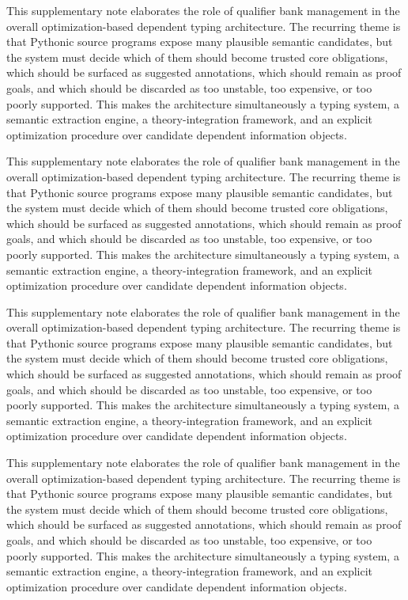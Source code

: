 \documentclass[11pt]{article}
\theoremstyle{definition}
\theoremstyle{plain}
\begin{document}
This supplementary note elaborates the role of qualifier bank management in the overall
optimization-based dependent typing architecture. The recurring theme is that
Pythonic source programs expose many plausible semantic candidates, but the
system must decide which of them should become trusted core obligations, which
should be surfaced as suggested annotations, which should remain as proof
goals, and which should be discarded as too unstable, too expensive, or too
poorly supported. This makes the architecture simultaneously a typing system,
a semantic extraction engine, a theory-integration framework, and an explicit
optimization procedure over candidate dependent information objects.

This supplementary note elaborates the role of qualifier bank management in the overall
optimization-based dependent typing architecture. The recurring theme is that
Pythonic source programs expose many plausible semantic candidates, but the
system must decide which of them should become trusted core obligations, which
should be surfaced as suggested annotations, which should remain as proof
goals, and which should be discarded as too unstable, too expensive, or too
poorly supported. This makes the architecture simultaneously a typing system,
a semantic extraction engine, a theory-integration framework, and an explicit
optimization procedure over candidate dependent information objects.

This supplementary note elaborates the role of qualifier bank management in the overall
optimization-based dependent typing architecture. The recurring theme is that
Pythonic source programs expose many plausible semantic candidates, but the
system must decide which of them should become trusted core obligations, which
should be surfaced as suggested annotations, which should remain as proof
goals, and which should be discarded as too unstable, too expensive, or too
poorly supported. This makes the architecture simultaneously a typing system,
a semantic extraction engine, a theory-integration framework, and an explicit
optimization procedure over candidate dependent information objects.

This supplementary note elaborates the role of qualifier bank management in the overall
optimization-based dependent typing architecture. The recurring theme is that
Pythonic source programs expose many plausible semantic candidates, but the
system must decide which of them should become trusted core obligations, which
should be surfaced as suggested annotations, which should remain as proof
goals, and which should be discarded as too unstable, too expensive, or too
poorly supported. This makes the architecture simultaneously a typing system,
a semantic extraction engine, a theory-integration framework, and an explicit
optimization procedure over candidate dependent information objects.
\end{document}
